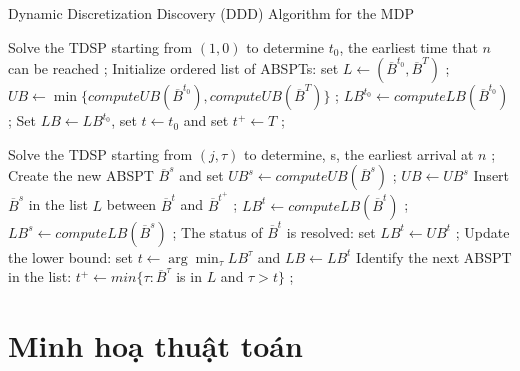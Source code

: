 \documentclass[../main.tex]{subfiles}
\begin{document}
\begin{algorithm}

\caption{Dynamic Discretization Discovery (DDD) Algorithm for the MDP}
\label{algo:1}
\begin{algorithmic}

\State Solve the TDSP starting from $(1, 0)$ to determine $t_0$, the earliest time that $n$ can be reached ;
\State Initialize ordered list of ABSPTs: set $L \leftarrow (\overline{B}^{t_0}, \overline{B}^{T})$  ;
\State $UB \leftarrow \min\{ computeUB(\overline{B}^{t_0}), computeUB(\overline{B}^{T})\}$ ;
\State $LB^{t_0} \leftarrow computeLB(\overline{B}^{t_0})$ ;
\State Set $LB \leftarrow LB^{t_0}$, set $t \leftarrow t_0$ and set $t^+ \leftarrow T$ ;

        \State Solve the TDSP starting from $(j, \tau)$ to determine, s, the earliest arrival at $n$ ;
        \State Create the new ABSPT $\overline{B}^s$ and set $UB^s \leftarrow computeUB(\overline{B}^s)$ ;
            \State $UB \leftarrow UB^s$
        \EndIf
        \State Insert $\overline{B}^s$ in the list $L$ between $\overline{B}^t$ and $\overline{B}^{t^+}$ ;
        \State $LB^t \leftarrow computeLB(\overline{B}^t)$ ;
        \State $LB^s \leftarrow computeLB(\overline{B}^s)$ ;
    \Else
        \State The status of $\overline{B}^t$ is resolved: set $LB^t \leftarrow UB^t$ ;
    \EndIf
    \State Update the lower bound: set $t \leftarrow \arg\min_{\tau}LB^{\tau}$ and $LB\leftarrow LB^t$ 
    \State Identify the next ABSPT in the list: $t^+ \leftarrow min\{\tau : \overline{B}^{\tau}$ is in $L$ and $\tau > t \}$ ;
\EndWhile
  
  \end{algorithmic}
\end{algorithm}

\section{Minh hoạ thuật toán}\label{minh-houx1ea1-thuux1eadt-touxe1n}
\end{document}
